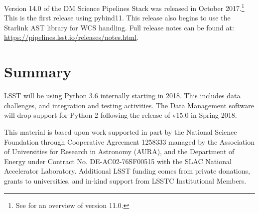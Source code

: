 \documentclass[11pt,twoside]{article}
\begin{document}
Version 14.0 of the DM Science Pipelines Stack was released in October 2017.\footnote{See \citet{P056_adassxxv} for an overview of version 11.0.}
This is the first release using pybind11.
This release also begins to use the Starlink AST library \citep{2016A&C....15...33B} for WCS handling.
Full release notes can be found at: \url{https://pipelines.lsst.io/releases/notes.html}.

\section{Summary}

LSST will be using Python 3.6 internally starting in 2018.
This includes data challenges, and integration and testing activities.
The Data Management software will drop support for Python 2 following the release of v15.0 in Spring 2018.

\acknowledgements This material is based upon work supported in part by the National Science Foundation through Cooperative Agreement 1258333 managed by the Association of Universities for Research in Astronomy (AURA), and the Department of Energy under Contract No. DE-AC02-76SF00515 with the SLAC National Accelerator Laboratory. Additional LSST funding comes from private donations, grants to universities, and in-kind support from LSSTC Institutional Members.

\end{document}

